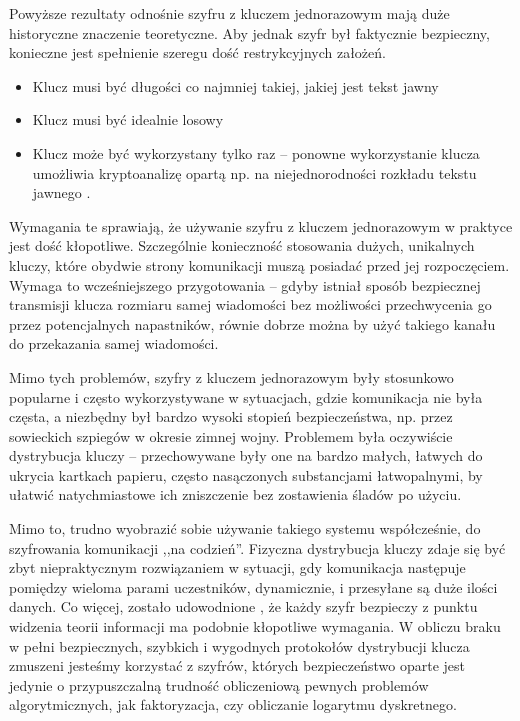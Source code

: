 \documentclass[10pt]{article}
\begin{document}
Powyższe rezultaty odnośnie szyfru z kluczem jednorazowym mają duże historyczne znaczenie teoretyczne.
Aby jednak szyfr był faktycznie bezpieczny, konieczne jest spełnienie szeregu dość restrykcyjnych
założeń.

\begin{itemize}
  \item Klucz musi być długości co najmniej takiej, jakiej jest tekst jawny
  \item Klucz musi być idealnie losowy
  \item Klucz może być wykorzystany tylko raz -- ponowne wykorzystanie klucza umożliwia kryptoanalizę
    opartą np. na niejednorodności rozkładu tekstu jawnego \footnotemark.
\end{itemize}


Wymagania te sprawiają, że używanie szyfru z kluczem jednorazowym w praktyce jest dość kłopotliwe.
Szczególnie konieczność stosowania dużych, unikalnych kluczy, które obydwie strony komunikacji muszą
posiadać przed jej rozpoczęciem. Wymaga to wcześniejszego przygotowania -- gdyby istniał sposób
bezpiecznej transmisji klucza rozmiaru samej wiadomości bez możliwości przechwycenia go przez 
potencjalnych napastników, równie dobrze można by użyć takiego kanału do przekazania samej wiadomości.

Mimo tych problemów, szyfry z kluczem jednorazowym były stosunkowo popularne i często wykorzystywane
w sytuacjach, gdzie komunikacja nie była częsta, a niezbędny był bardzo wysoki stopień bezpieczeństwa,
np. przez sowieckich szpiegów w okresie zimnej wojny. Problemem była oczywiście dystrybucja kluczy
-- przechowywane były one na bardzo małych, łatwych do ukrycia kartkach papieru, często nasączonych
substancjami łatwopalnymi, by ułatwić natychmiastowe ich zniszczenie bez zostawienia śladów po użyciu.

Mimo to, trudno wyobrazić sobie używanie takiego systemu współcześnie, do szyfrowania komunikacji
,,na codzień''. Fizyczna dystrybucja kluczy zdaje się być zbyt niepraktycznym rozwiązaniem w sytuacji,
gdy komunikacja następuje pomiędzy wieloma parami uczestników, dynamicznie, i przesyłane są duże
ilości danych. Co więcej, zostało udowodnione \cite{Shannon49}, że każdy szyfr bezpieczy z punktu
widzenia teorii informacji ma podobnie kłopotliwe wymagania. W obliczu braku w pełni bezpiecznych,
szybkich i wygodnych protokołów dystrybucji klucza zmuszeni jesteśmy korzystać z szyfrów, których
bezpieczeństwo oparte jest jedynie o przypuszczalną \footnotemark trudność obliczeniową pewnych 
problemów algorytmicznych, jak faktoryzacja, czy obliczanie logarytmu dyskretnego.
\end{document}

